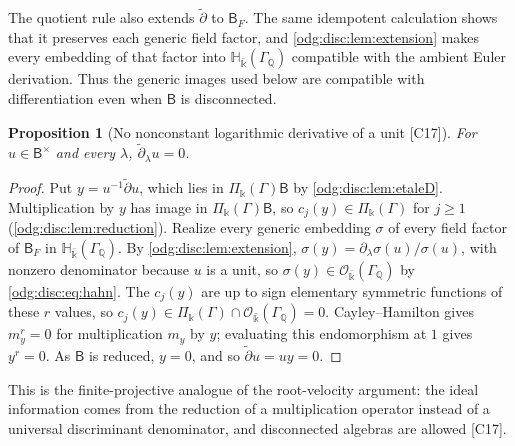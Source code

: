 \documentclass[11pt,oneside]{article}
\numberwithin{equation}{section}
\newtheorem{proposition}[proposition]{Proposition}
\theoremstyle{definition}
\theoremstyle{remark}
\newcommand{\Q}{\mathbb Q}
\newcommand{\src}[1]{\textup{\textsf{\small[#1]}}}
\newcommand{\crP}{\Pi_\Bbbk(\Gamma)}
\newcommand{\Hbar}{\mathbb H_{\bar\Bbbk}(\Gamma_\Q)}
\newcommand{\Obar}{\mathcal O_{\bar\Bbbk}(\Gamma_\Q)}
\begin{document}
The quotient rule also extends $\widetilde\partial$ to $\mathsf B_F$. The same
idempotent calculation shows that it preserves each generic field factor, and
\cref{odg:disc:lem:extension} makes every embedding of that factor into $\Hbar$
compatible with the ambient Euler derivation. Thus the generic images used below
are compatible with differentiation even when $\mathsf B$ is disconnected.

\begin{proposition}[No nonconstant logarithmic derivative of a unit \src{C17}]\label{odg:disc:prop:unitD}
For $u\in\mathsf B^\times$ and every $\lambda$, $\widetilde\partial_\lambda u=0$.
\end{proposition}
\begin{proof}
Put $y=u^{-1}\widetilde\partial u$, which lies in $\crP\mathsf B$ by
\cref{odg:disc:lem:etaleD}. Multiplication by $y$ has image in $\crP\mathsf B$, so
$c_j(y)\in\crP$ for $j\ge1$ (\cref{odg:disc:lem:reduction}). Realize every generic
embedding $\sigma$ of every field factor of $\mathsf B_F$ in $\Hbar$. By
\cref{odg:disc:lem:extension}, $\sigma(y)=\partial_\lambda\sigma(u)/\sigma(u)$, with nonzero
denominator because $u$ is a unit, so $\sigma(y)\in\Obar$ by \eqref{odg:disc:eq:hahn}. The
$c_j(y)$ are up to sign elementary symmetric functions of these $r$ values, so
$c_j(y)\in\crP\cap\Obar=0$. Cayley--Hamilton gives $m_y^r=0$ for multiplication
$m_y$ by $y$; evaluating this endomorphism at $1$ gives $y^r=0$. As $\mathsf B$ is reduced,
$y=0$, and so $\widetilde\partial u=uy=0$.
\end{proof}

This is the finite-projective analogue of the root-velocity argument: the ideal
information comes from the reduction of a multiplication operator instead of a universal
discriminant denominator, and disconnected algebras are allowed \src{C17}.
\end{document}
